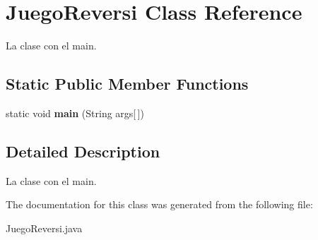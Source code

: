 \hypertarget{class_juego_reversi}{}\section{Juego\+Reversi Class Reference}
\label{class_juego_reversi}


La clase con el main.  


\subsection*{Static Public Member Functions}
\begin{DoxyCompactItemize}
\item 
\mbox{\label{class_juego_reversi_a7cd2cb905cfea85f33875453acfc861e}} 
static void {\bfseries main} (String args\mbox{[}$\,$\mbox{]})
\end{DoxyCompactItemize}


\subsection{Detailed Description}
La clase con el main. 

The documentation for this class was generated from the following file\+:\begin{DoxyCompactItemize}
\item 
Juego\+Reversi.\+java\end{DoxyCompactItemize}
